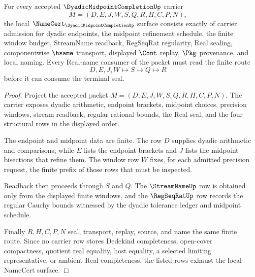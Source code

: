 \begin{theorem}
\label{thm:dyadic-midpoint-completion-namecert-obligations}
For every accepted $\DyadicMidpointCompletionUp$ carrier
$$
M=(D,E,J,W,S,Q,R,H,C,P,N),
$$
the local $\NameCert_{\DyadicMidpointCompletionUp}$ surface consists exactly of carrier admission for dyadic endpoints, the midpoint refinement schedule, the finite window budget, StreamName readback, RegSeqRat regularity, Real sealing, componentwise $\hsame$ transport, displayed $\Cont$ replay, $\Pkg$ provenance, and local naming. Every Real-name consumer of the packet must read the finite route
$$
D,E,J,W \longmapsto S \longmapsto Q \longmapsto R
$$
before it can consume the terminal seal.
\end{theorem}

\begin{proof}
Project the accepted packet $M=(D,E,J,W,S,Q,R,H,C,P,N)$. The carrier exposes dyadic arithmetic, endpoint brackets, midpoint choices, precision windows, stream readback, regular rational bounds, the Real seal, and the four structural rows in the displayed order.

The endpoint and midpoint data are finite. The row $D$ supplies dyadic arithmetic and comparisons, while $E$ lists the endpoint brackets and $J$ lists the midpoint bisections that refine them. The window row $W$ fixes, for each admitted precision request, the finite prefix of those rows that must be inspected.

Readback then proceeds through $S$ and $Q$. The $\StreamNameUp$ row is obtained only from the displayed finite windows, and the $\RegSeqRatUp$ row records the regular Cauchy bounds witnessed by the dyadic tolerance ledger and midpoint schedule.

Finally $R,H,C,P,N$ seal, transport, replay, source, and name the same finite route. Since no carrier row stores Dedekind completeness, open-cover compactness, quotient real equality, host equality, a selected limiting representative, or ambient Real completeness, the listed rows exhaust the local NameCert surface.
\end{proof}


